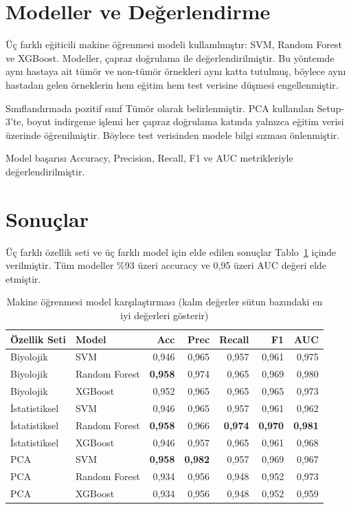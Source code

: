 \documentclass[12pt,a4paper,oneside]{report}
\begin{document}
\section{Modeller ve Değerlendirme}

Üç farklı eğiticili makine öğrenmesi modeli kullanılmıştır: SVM, Random Forest ve XGBoost. Modeller, çapraz doğrulama ile değerlendirilmiştir. Bu yöntemde aynı hastaya ait tümör ve non-tümör örnekleri aynı katta tutulmuş, böylece aynı hastadan gelen örneklerin hem eğitim hem test verisine düşmesi engellenmiştir.

Sınıflandırmada pozitif sınıf Tümör olarak belirlenmiştir. PCA kullanılan Setup-3'te, boyut indirgeme işlemi her çapraz doğrulama katında yalnızca eğitim verisi üzerinde öğrenilmiştir. Böylece test verisinden modele bilgi sızması önlenmiştir.

Model başarısı Accuracy, Precision, Recall, F1 ve AUC metrikleriyle değerlendirilmiştir.

\section{Sonuçlar}

Üç farklı özellik seti ve üç farklı model için elde edilen sonuçlar Tablo~\ref{tab:ml} içinde verilmiştir. Tüm modeller \%93 üzeri accuracy ve 0,95 üzeri AUC değeri elde etmiştir.

\begin{table}[H]
\centering
\caption{Makine öğrenmesi model karşılaştırması (kalın değerler sütun bazındaki en iyi değerleri gösterir)}
\label{tab:ml}
\begin{tabular}{llrrrrr}
\toprule
\textbf{Özellik Seti} & \textbf{Model} & \textbf{Acc} & \textbf{Prec} & \textbf{Recall} & \textbf{F1} & \textbf{AUC} \\
\midrule
Biyolojik & SVM & 0,946 & 0,965 & 0,957 & 0,961 & 0,975 \\
Biyolojik & Random Forest & \textbf{0,958} & 0,974 & 0,965 & 0,969 & 0,980 \\
Biyolojik & XGBoost & 0,952 & 0,965 & 0,965 & 0,965 & 0,973 \\
İstatistiksel & SVM & 0,946 & 0,965 & 0,957 & 0,961 & 0,962 \\
İstatistiksel & Random Forest & \textbf{0,958} & 0,966 & \textbf{0,974} & \textbf{0,970} & \textbf{0,981} \\
İstatistiksel & XGBoost & 0,946 & 0,957 & 0,965 & 0,961 & 0,968 \\
PCA & SVM & \textbf{0,958} & \textbf{0,982} & 0,957 & 0,969 & 0,967 \\
PCA & Random Forest & 0,934 & 0,956 & 0,948 & 0,952 & 0,973 \\
PCA & XGBoost & 0,934 & 0,956 & 0,948 & 0,952 & 0,959 \\
\bottomrule
\end{tabular}
\end{table}
\end{document}
